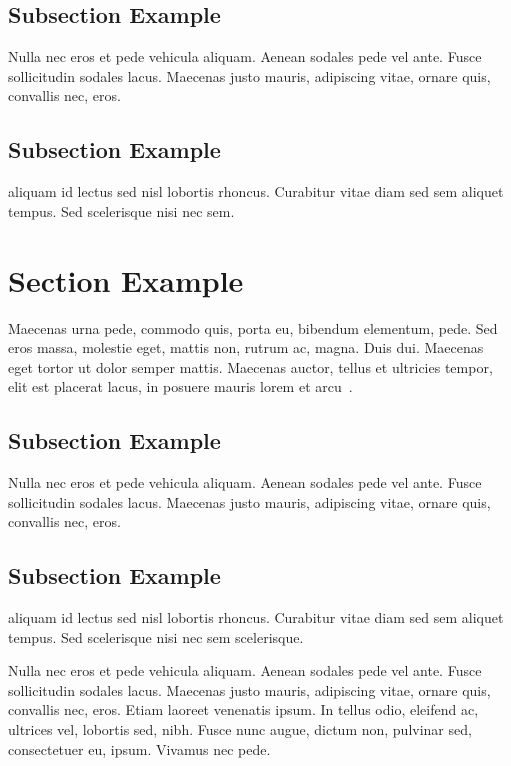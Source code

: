 \subsection{Subsection Example}

Nulla nec eros et pede vehicula aliquam. Aenean sodales pede vel
ante. Fusce sollicitudin sodales lacus. Maecenas justo mauris,
adipiscing vitae, ornare quis, convallis nec, eros. 

\subsection{Subsection Example}

\textcite{khakipoor_linear_2023,liu_energy_2023} aliquam id lectus sed nisl lobortis rhoncus. 
Curabitur vitae diam sed sem aliquet tempus. Sed scelerisque 
nisi nec sem.

\section{Section Example}

Maecenas urna pede, commodo quis, porta eu, bibendum elementum, 
pede. Sed eros massa, molestie eget, mattis non, rutrum ac, 
magna. Duis dui. Maecenas eget tortor ut dolor semper mattis. 
Maecenas auctor, tellus et ultricies tempor, elit est placerat 
lacus, in posuere mauris lorem et arcu~\parencite{monopoli_exploiting_2023,zhang_carma_2023,chang_adas_2023, guo_rapidstream_2023}. 

\subsection{Subsection Example}

Nulla nec eros et pede vehicula aliquam. Aenean sodales pede vel
ante. Fusce sollicitudin sodales lacus. Maecenas justo mauris,
adipiscing vitae, ornare quis, convallis nec, eros. 

\subsection{Subsection Example}

\textcite{khakipoor_linear_2023,liu_energy_2023} aliquam id lectus sed nisl lobortis rhoncus. 
Curabitur vitae diam sed sem aliquet tempus. Sed scelerisque 
nisi nec sem scelerisque.

Nulla nec eros et pede vehicula aliquam. Aenean sodales pede vel
ante. Fusce sollicitudin sodales lacus. Maecenas justo mauris,
adipiscing vitae, ornare quis, convallis nec, eros. Etiam laoreet
venenatis ipsum. In tellus odio, eleifend ac, ultrices vel, lobortis
sed, nibh. Fusce nunc augue, dictum non, pulvinar sed, consectetuer
eu, ipsum. Vivamus nec pede.  
